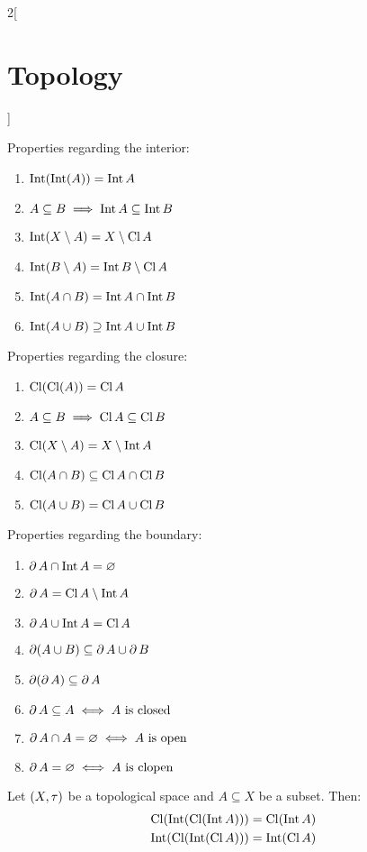 \documentclass[../../../main.tex]{subfiles}
\begin{document}
\begin{multicols}{2}[\section{Topology}]
\begin{prop}
        Properties regarding the interior:
        \begin{enumerate}[leftmargin=1.15cm]\renewcommand{\labelenumi}{1.\arabic{enumi}.}
            \item $\operatorname{Int}(\operatorname{Int} (A))=         \operatorname{Int} A$
            \item $A\subseteq B\implies    \operatorname{Int} A\subseteq\operatorname{Int} B$
            \item $\operatorname{Int}(X\setminus A)=     X\setminus \operatorname{Cl} A$
            \item $\operatorname{Int}(B\setminus A)=     \operatorname{Int} B\setminus \operatorname{Cl} A$
            \item $\operatorname{Int}(A\cap B)=          \operatorname{Int} A\cap\operatorname{Int} B$
            \item $\operatorname{Int}(A\cup B)\supseteq  \operatorname{Int} A\cup\operatorname{Int} B$
        \end{enumerate}
        Properties regarding the closure:
        \begin{enumerate}[leftmargin=1.15cm]\renewcommand{\labelenumi}{2.\arabic{enumi}.}
            \item $\operatorname{Cl}(\operatorname{Cl} (A))=          \operatorname{Cl} A$
            \item $A\subseteq B\implies   \operatorname{Cl} A\subseteq\operatorname{Cl} B$
            \item $\operatorname{Cl}(X\setminus A)=     X\setminus \operatorname{Int} A$
            \item $\operatorname{Cl}(A\cap B)\subseteq  \operatorname{Cl} A\cap\operatorname{Cl} B$
            \item $\operatorname{Cl}(A\cup B)=          \operatorname{Cl} A\cup\operatorname{Cl} B$
        \end{enumerate}
        Properties regarding the boundary:
        \begin{enumerate}[leftmargin=1.15cm]\renewcommand{\labelenumi}{3.\arabic{enumi}.}
            \item $\operatorname{\partial} A\cap\operatorname{Int} A=         \varnothing$
            \item $\operatorname{\partial} A=\operatorname{Cl} A\setminus\operatorname{Int} A$
            \item $\operatorname{\partial} A\cup\operatorname{Int} A=             \operatorname{Cl} A$
            \item $\operatorname{\partial} (A\cup B)\subseteq \operatorname{\partial} A\cup \operatorname{\partial} B$
            \item $\operatorname{\partial} (\operatorname{\partial} A)\subseteq \operatorname{\partial} A$
            \item $\operatorname{\partial} A\subseteq A\iff  A  \text{ is closed}$
            \item $\operatorname{\partial} A\cap A=\varnothing\iff  A\text{ is open}$
            \item $\operatorname{\partial} A=\varnothing\iff\text{$A$ is clopen}$
        \end{enumerate}
    \end{prop}
    \begin{prop}
        Let $(X,\tau)$ be a topological space and $A\subseteq X$ be a subset. Then:
        \begin{gather*}
            \operatorname{Cl}(\operatorname{Int}(\operatorname{Cl}(\operatorname{Int} A)))=\operatorname{Cl}(\operatorname{Int} A)\\
            \operatorname{Int}(\operatorname{Cl}(\operatorname{Int} (\operatorname{Cl} A)))=\operatorname{Int}(\operatorname{Cl} A)
        \end{gather*}
    \end{prop}

\end{multicols}
\end{document}

